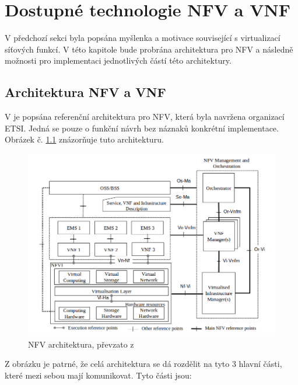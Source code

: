 \chapter{Dostupné technologie NFV a VNF}

V předchozí sekci byla popsána myšlenka a motivace související s virtualizací síťových funkcí. V této kapitole bude probrána architektura pro NFV a následně možnosti pro implementaci jednotlivých částí této architektury. 

\section{Architektura NFV a VNF} 

V \cite{NFV_architektura} je popsána referenční architektura pro NFV, která byla navržena organizací ETSI. Jedná se pouze o funkční návrh bez náznaků konkrétní implementace. Obrázek č. \ref{fig:NFV_architektura} znázorňuje tuto architekturu.  

\begin{figure}[h]
\begin{centering}
\includegraphics[scale=0.5]{images/NFV_architektura}
\par\end{centering}
\caption{NFV architektura, převzato z \cite{NFV_architektura}\label{fig:NFV_architektura}}
\end{figure}

Z obrázku je patrné, že celá architektura se dá rozdělit na tyto 3 hlavní části, které mezi sebou mají komunikovat. Tyto části jsou:

